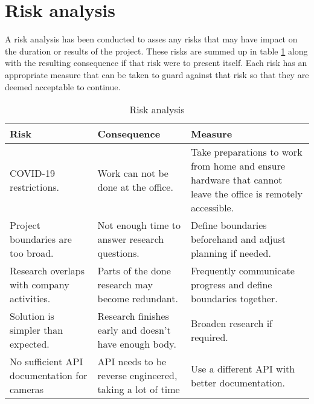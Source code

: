 \documentclass[11pt, a4paper]{article}
\begin{document}
\section{Risk analysis}
A risk analysis has been conducted to asses any risks that may have impact on the duration or results of the project. These risks are summed up in table
\ref{tab:risks} along with the resulting consequence if that risk were to present itself. Each risk has an appropriate measure that can be taken to guard
against that risk so that they are deemed acceptable to continue.

\begin{table}[h]
\centering
\caption{Risk analysis}
\label{tab:risks}
    \begin{tabular}{ | m{10em} | m{10em} | m{10em} | }
    \hline
    \textbf{Risk} & \textbf{Consequence} & \textbf{Measure} \\
    \hline
    COVID-19 restrictions. & Work can not be done at the office. & Take preparations to work from home and ensure hardware that cannot leave the office is remotely accessible. \\
    \hline
    Project boundaries are too broad. & Not enough time to answer research questions. & Define boundaries beforehand and adjust planning if needed. \\
    \hline
    Research overlaps with company activities. & Parts of the done research may become redundant. & Frequently communicate progress and define boundaries together. \\
    \hline
    Solution is simpler than expected. & Research finishes early and doesn't have enough body. & Broaden research if required. \\
    \hline
    No sufficient API documentation for cameras & API needs to be reverse engineered, taking a lot of time & Use a different API with better documentation. \\
    \hline
    \end{tabular}
\end{table}
\newpage

    
\end{document}
